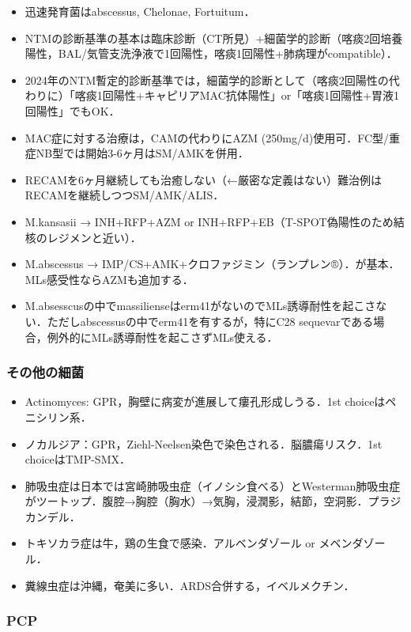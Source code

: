 \begin{itemize}
\item 迅速発育菌はabscessus, Chelonae, Fortuitum．
\item NTMの診断基準の基本は臨床診断（CT所見）+細菌学的診断（喀痰2回培養陽性，BAL/気管支洗浄液で1回陽性，喀痰1回陽性+肺病理がcompatible）．
\item 2024年のNTM暫定的診断基準では，細菌学的診断として（喀痰2回陽性の代わりに）「喀痰1回陽性+キャピリアMAC抗体陽性」or「喀痰1回陽性+胃液1回陽性」でもOK．
\item MAC症に対する治療は，CAMの代わりにAZM (250mg/d)使用可．FC型/重症NB型では開始3-6ヶ月はSM/AMKを併用．
\item RECAMを6ヶ月継続しても治癒しない（←厳密な定義はない）難治例はRECAMを継続しつつSM/AMK/ALIS．
\item M.kansasii → INH+RFP+AZM or INH+RFP+EB（T-SPOT偽陽性のため結核のレジメンと近い）．
\item M.abscessus → IMP/CS+AMK+クロファジミン（ランプレン®）．が基本．MLs感受性ならAZMも追加する．
\item M.absesscusの中でmassilienseはerm41がないのでMLs誘導耐性を起こさない．ただしabscessusの中でerm41を有するが，特にC28 sequevarである場合，例外的にMLs誘導耐性を起こさずMLs使える．
\end{itemize}


\subsubsection{その他の細菌}

\begin{itemize}
\item Actinomyces: GPR，胸壁に病変が進展して瘻孔形成しうる．1st choiceはペニシリン系．
\item ノカルジア：GPR，Ziehl-Neelsen染色で染色される．脳膿瘍リスク．1st choiceはTMP-SMX．
\item 肺吸虫症は日本では宮崎肺吸虫症（イノシシ食べる）とWesterman肺吸虫症がツートップ．腹腔→胸腔（胸水）→気胸，浸潤影，結節，空洞影．プラジカンデル．
\item トキソカラ症は牛，鶏の生食で感染．アルベンダゾール or メベンダゾール．
\item 糞線虫症は沖縄，奄美に多い．ARDS合併する，イベルメクチン．
\end{itemize}


\subsubsection{PCP}

